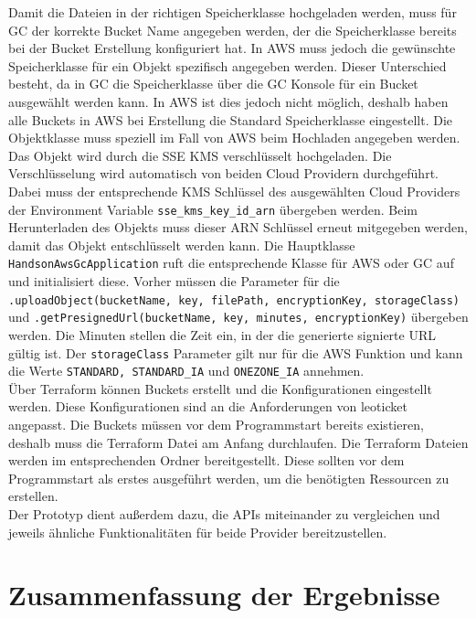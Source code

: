 Damit die Dateien in der richtigen Speicherklasse hochgeladen werden, muss für GC der korrekte Bucket Name angegeben werden, der die Speicherklasse bereits bei der Bucket Erstellung konfiguriert hat. In AWS muss jedoch die gewünschte Speicherklasse für ein Objekt spezifisch angegeben werden. Dieser Unterschied besteht, da in GC die Speicherklasse über die GC Konsole für ein Bucket ausgewählt werden kann. In AWS ist dies jedoch nicht möglich, deshalb haben alle Buckets in AWS bei Erstellung die Standard Speicherklasse eingestellt. Die Objektklasse muss speziell im Fall von AWS beim Hochladen angegeben werden.\\ 

Das Objekt wird durch die SSE KMS verschlüsselt hochgeladen. Die Verschlüsselung wird automatisch von beiden Cloud Providern durchgeführt. Dabei muss der entsprechende KMS Schlüssel des ausgewählten Cloud Providers der Environment Variable \verb|sse_kms_key_id_arn| übergeben werden. Beim Herunterladen des Objekts muss dieser ARN Schlüssel erneut mitgegeben werden, damit das Objekt entschlüsselt werden kann. Die Hauptklasse \verb|HandsonAwsGcApplication| ruft die entsprechende Klasse für AWS oder GC auf und initialisiert diese. Vorher müssen die Parameter für die \verb|.uploadObject(bucketName, key, filePath, encryptionKey, storageClass)| und \verb|.getPresignedUrl(bucketName, key, minutes, encryptionKey)| übergeben werden. Die Minuten stellen die Zeit ein, in der die generierte signierte URL gültig ist. Der \verb|storageClass| Parameter gilt nur für die AWS Funktion und kann die Werte \verb|STANDARD, STANDARD_IA| und \verb|ONEZONE_IA| annehmen.\\

Über Terraform können Buckets erstellt und die Konfigurationen eingestellt werden. Diese Konfigurationen sind an die Anforderungen von leoticket angepasst. Die Buckets müssen vor dem Programmstart bereits existieren, deshalb muss die Terraform Datei am Anfang durchlaufen. Die Terraform Dateien werden im entsprechenden Ordner bereitgestellt. Diese sollten vor dem Programmstart als erstes ausgeführt werden, um die benötigten Ressourcen zu erstellen.\\

Der Prototyp dient außerdem dazu, die APIs miteinander zu vergleichen und jeweils ähnliche Funktionalitäten für beide Provider bereitzustellen.

\newpage

\section{Zusammenfassung der Ergebnisse}

